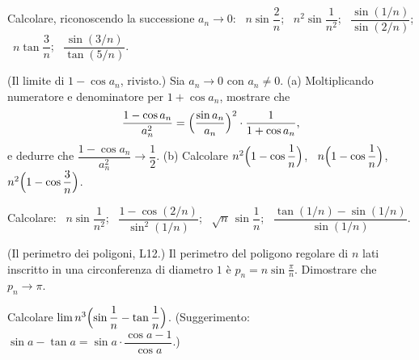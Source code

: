 \begin{esercizio}[\liv{1}]
Calcolare, riconoscendo la successione $a_n\to0$: \ $n\sin\dfrac2n$; \ $n^2\sin\dfrac1{n^2}$; \ $\dfrac{\sin(1/n)}{\sin(2/n)}$; \ $n\tan\dfrac3n$; \ $\dfrac{\sin(3/n)}{\tan(5/n)}$.
\end{esercizio}

\begin{esercizio}[\liv{2}]\label{es:s5cos}
(Il limite di $1-\cos a_n$, rivisto.) Sia $a_n\to0$ con $a_n\ne0$. (a) Moltiplicando numeratore e denominatore per $1+\cos a_n$, mostrare che
\[
\frac{1-\cos a_n}{a_n^2}=\Bigl(\frac{\sin a_n}{a_n}\Bigr)^2\cdot\frac1{1+\cos a_n},
\]
e dedurre che $\dfrac{1-\cos a_n}{a_n^2}\to\dfrac12$. (b) Calcolare $n^2\Bigl(1-\cos\dfrac1n\Bigr)$, \ $n\Bigl(1-\cos\dfrac1n\Bigr)$, \ $n^2\Bigl(1-\cos\dfrac3n\Bigr)$.
\end{esercizio}

\begin{esercizio}[\liv{2}]
Calcolare: \ $n\sin\dfrac1{n^2}$; \ $\dfrac{1-\cos(2/n)}{\sin^2(1/n)}$; \ $\sqrt n\,\sin\dfrac1n$; \ $\dfrac{\tan(1/n)-\sin(1/n)}{\sin(1/n)}$.
\end{esercizio}

\begin{esercizio}[\liv{2}]
(Il perimetro dei poligoni, L12.) Il perimetro del poligono regolare di $n$ lati inscritto in una circonferenza di diametro $1$ è $p_n=n\sin\frac\pi n$. Dimostrare che $p_n\to\pi$.
\end{esercizio}

\begin{esercizio}[\liv{3}]
Calcolare $\lim n^3\Bigl(\sin\dfrac1n-\tan\dfrac1n\Bigr)$. (Suggerimento: $\sin a-\tan a=\sin a\cdot\dfrac{\cos a-1}{\cos a}$.)
\end{esercizio}

